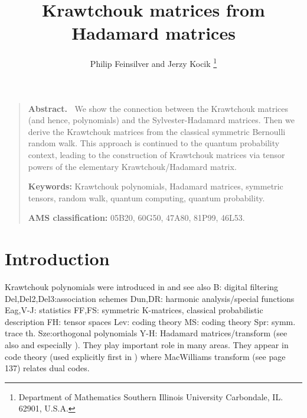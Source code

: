 \documentclass[12pt]{article}    %
\title{Krawtchouk matrices from Hadamard matrices}
\author{Philip Feinsilver and Jerzy Kocik
\thanks{\leftskip -1cm Department of Mathematics
Southern Illinois University Carbondale, IL. 62901, U.S.A.} 
}
\date{}
\renewenvironment{abstract}{\begin{quote}{\bf Abstract.\
}\small}{\end{quote}\bigskip}
\begin{document}
 

\maketitle

\begin{abstract}
We show the connection between the Krawtchouk matrices (and hence,
polynomials) and the Sylvester-Hadamard matrices. Then we derive the
Krawtchouk matrices from the classical symmetric Bernoulli random
walk. This approach is continued to the quantum probability context, 
leading to the construction of Krawtchouk matrices via tensor powers 
of the elementary Krawtchouk/Hadamard matrix. 

{\bf Keywords:} Krawtchouk polynomials, Hadamard matrices, 
symmetric tensors, random walk, quantum computing, quantum probability.

{\bf AMS classification:} 
05B20, %
60G50, %
47A80, %
81P99, %
46L53. %


\end{abstract}



\section{Introduction}
\label{sec:intro}

Krawtchouk polynomials were introduced in \cite{Kra} and see also \cite{Kra2} 
B: digital filtering
Del,Del2,Del3:association schemes
Dun,DR: harmonic analysis/special functions
Eag,V-J: statistics
FF,FS: symmetric K-matrices, classical probabilistic description
FH: tensor spaces
Lev: coding theory
MS: coding theory
Spr: symm. trace th.
Sze:orthogonal polynomials
Y-H: Hadamard matrices/transform
(see also 
\cite{B,Dun, DR, Eag, Kra2, V-J} and especially \cite{Sze}). They 
play important role in many areas.  They appear in code theory 
(used explicitly first in \cite{Del, Del2, Del3}) where 
MacWilliams transform (see \cite{MS} page 137) relates dual codes. 




\vfill       %
\newpage     %
\end{document}
